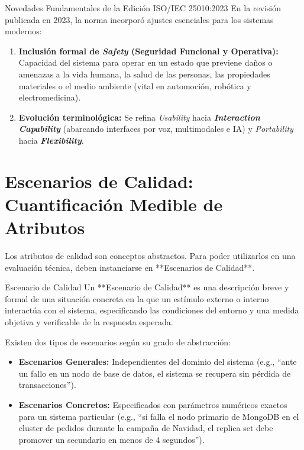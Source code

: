 \begin{importante}{Novedades Fundamentales de la Edición ISO/IEC 25010:2023}
En la revisión publicada en 2023, la norma incorporó ajustes esenciales para los sistemas modernos:
\begin{enumerate}[leftmargin=1.5em]
  \item \textbf{Inclusión formal de \emph{Safety} (Seguridad Funcional y Operativa):} Capacidad del sistema para operar en un estado que previene daños o amenazas a la vida humana, la salud de las personas, las propiedades materiales o el medio ambiente (vital en automoción, robótica y electromedicina).
  \item \textbf{Evolución terminológica:} Se refina \emph{Usability} hacia \textbf{\emph{Interaction Capability}} (abarcando interfaces por voz, multimodales e IA) y \emph{Portability} hacia \textbf{\emph{Flexibility}}.
\end{enumerate}
\end{importante}

\section{Escenarios de Calidad: Cuantificación Medible de Atributos}
\label{sec:escenarios-calidad}

Los atributos de calidad son conceptos abstractos. Para poder utilizarlos en una evaluación técnica, deben instanciarse en **Escenarios de Calidad**.

\begin{definicion}{Escenario de Calidad}
Un **Escenario de Calidad** es una descripción breve y formal de una situación concreta en la que un estímulo externo o interno interactúa con el sistema, especificando las condiciones del entorno y una medida objetiva y verificable de la respuesta esperada.
\end{definicion}

Existen dos tipos de escenarios según su grado de abstracción:
\begin{itemize}[leftmargin=1.5em]
  \item \textbf{Escenarios Generales:} Independientes del dominio del sistema (e.g., ``ante un fallo en un nodo de base de datos, el sistema se recupera sin pérdida de transacciones'').
  \item \textbf{Escenarios Concretos:} Especificados con parámetros numéricos exactos para un sistema particular (e.g., ``si falla el nodo primario de MongoDB en el cluster de pedidos durante la campaña de Navidad, el replica set debe promover un secundario en menos de 4 segundos'').
\end{itemize}


